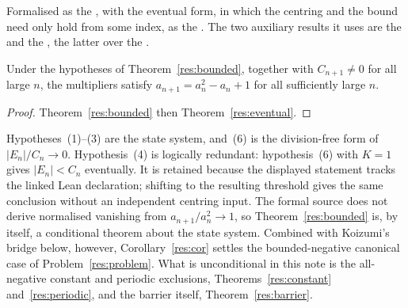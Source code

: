 \documentclass[11pt]{article}
\begin{document}
\noindent Formalised as the
, with the eventual form, in which the centring and the bound need
only hold from some index, as the
.  The two auxiliary results it uses are the
 and the
, the latter over the
.

\begin{corollary}\label{res:cor}
Under the hypotheses of Theorem~\ref{res:bounded}, together with
$C_{n+1}\ne0$ for all large $n$, the multipliers satisfy
$a_{n+1}=a_n^{2}-a_n+1$ for all sufficiently large $n$.
\end{corollary}

\begin{proof}
Theorem~\ref{res:bounded} then Theorem~\ref{res:eventual}.
\end{proof}

Hypotheses~(1)--(3) are the state system, and~(6) is the division-free form of
$|E_n|/C_n\to0$.  Hypothesis~(4) is logically redundant: hypothesis~(6) with
$K=1$ gives $|E_n|<C_n$ eventually.  It is retained because the displayed
statement tracks the linked Lean declaration; shifting to the resulting
threshold gives the same conclusion without an independent centring input.
The formal source does not derive normalised vanishing from
$a_{n+1}/a_n^{2}\to1$, so Theorem~\ref{res:bounded} is, by itself, a
conditional theorem about the state system.  Combined with
Koizumi's bridge below, however, Corollary~\ref{res:cor} settles the
bounded-negative canonical case of Problem~\ref{res:problem}.  What is
unconditional in this note is the all-negative constant and periodic
exclusions, Theorems~\ref{res:constant} and~\ref{res:periodic}, and the barrier
itself, Theorem~\ref{res:barrier}.
\end{document}
